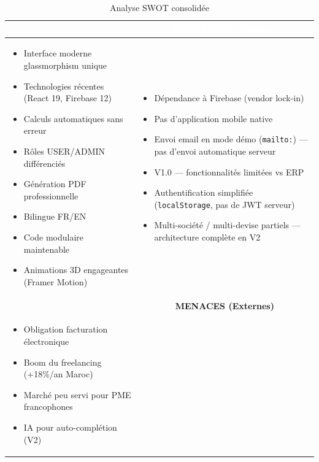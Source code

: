 \documentclass[12pt,a4paper]{report}
\begin{document}
\begin{table}[H]
\centering
\caption{Analyse SWOT consolidée}
\label{tab:swot}
\begin{tabular}{|p{}|p{}|}
\hline
\rowcolor{emsiblue}\multicolumn{1}{|c|}{\textcolor{white}{\textbf{FORCES (Internes)}}} & \multicolumn{1}{c|}{\textcolor{white}{\textbf{FAIBLESSES (Internes)}}} \\
\hline
\begin{itemize}[leftmargin=*, noitemsep]
    \item Interface moderne glassmorphism unique
    \item Technologies récentes (React 19, Firebase 12)
    \item Calculs automatiques sans erreur
    \item Rôles USER/ADMIN différenciés
    \item Génération PDF professionnelle
    \item Bilingue FR/EN
    \item Code modulaire maintenable
    \item Animations 3D engageantes (Framer Motion)
\end{itemize}
&
\begin{itemize}[leftmargin=*, noitemsep]
    \item Dépendance à Firebase (vendor lock-in)
    \item Pas d'application mobile native
    \item Envoi email en mode démo (\texttt{mailto:}) — pas d'envoi automatique serveur
    \item V1.0 — fonctionnalités limitées vs ERP
    \item Authentification simplifiée (\texttt{localStorage}, pas de JWT serveur)
    \item Multi-société / multi-devise partiels — architecture complète en V2
\end{itemize}
\\
\hline
\rowcolor{lightblue}\multicolumn{1}{|c|}{\textbf{OPPORTUNITÉS (Externes)}} & \multicolumn{1}{c|}{\textbf{MENACES (Externes)}} \\
\hline
\begin{itemize}[leftmargin=*, noitemsep]
    \item Obligation facturation électronique
    \item Boom du freelancing (+18\%/an Maroc)
    \item Marché peu servi pour PME francophones
    \item IA pour auto-complétion (V2)

\end{itemize}
\end{tabular}
\end{table}
\end{document}
